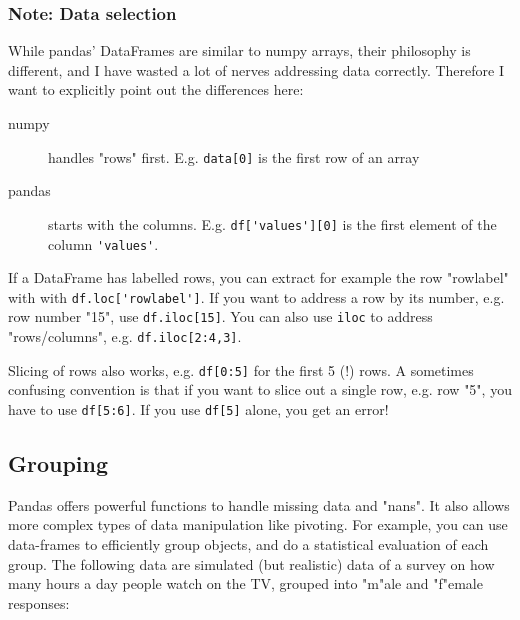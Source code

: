 \subsubsection{Note: Data selection}

While pandas' DataFrames are similar to numpy arrays, their philosophy is different, and I have wasted a lot of nerves addressing data correctly. Therefore I want to explicitly point out the differences here:

\begin{description}
  \item[numpy] handles "rows" first. E.g. \lstinline{data[0]} is the first row of an array
  \item[pandas] starts with the columns. E.g. \lstinline{df['values'][0]} is the first element of the column \lstinline{'values'}.
\end{description}

If a DataFrame has labelled rows, you can extract for example the row "rowlabel" with with \lstinline{df.loc['rowlabel']}. If you want to address a row by its number, e.g. row number "15", use \lstinline{df.iloc[15]}. You can also use \lstinline{iloc} to address "rows/columns", e.g. \lstinline{df.iloc[2:4,3]}.

Slicing of rows also works, e.g. \lstinline{df[0:5]} for the first 5 (!) rows. A sometimes confusing convention is that if you want to slice out a single row, e.g. row "5", you have to use \lstinline{df[5:6]}. If you use \lstinline{df[5]} alone, you get an error!

\subsection{Grouping}

Pandas offers powerful functions to handle missing data and "nans". It also allows more complex types of data manipulation like pivoting.
For example, you can use data-frames to efficiently group objects, and do a statistical evaluation of each group. The following data are simulated (but realistic) data of a survey on how many hours a day people watch on the TV, grouped into "m"ale and "f"emale responses:

